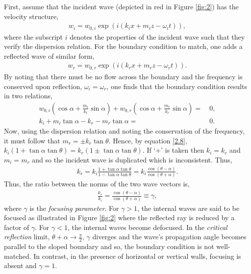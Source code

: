 \documentclass[a4paper]{article}
\numberwithin{equation}{section}
\begin{document}
First, assume that the incident wave (depicted in red in Figure \ref{fig:2}) has the velocity structure, 
\begin{align*}
w_i = w_{0,i}\exp(i(k_ix+m_iz-\omega_i t)),
\end{align*}
where the subscript $i$ denotes the properties of the incident wave such that they verify the dispersion relation. For the boundary condition to match, one adds a reflected wave of similar form, 
\begin{align*}
w_r = w_{0,r}\exp(i(k_rx+m_rz-\omega_r t)).
\end{align*}
By noting that there must be no flow across the boundary and the frequency is conserved upon reflection, $\omega_i = \omega_r$, one finds that the boundary condition results in two relations, 
\begin{align}\label{eq:2.7}
w_{0,i}(\cos \alpha + \frac{m_i}{k_i}\sin\alpha) + w_{0,r}(\cos \alpha + \frac{m_r}{k_r}\sin\alpha) =&~ 0, \\ \label{2.8}
k_i + m_i\tan \alpha - k_r - m_r\tan\alpha =&~ 0.
\end{align}
Now, using the dispersion relation and noting the conservation of the frequency, it must follow that $m_r = \pm k_r\tan\theta$. Hence, by equation \eqref{2.8}, $k_i(1 + \tan\alpha\tan\theta) = k_r(1 \pm \tan\alpha\tan\theta)$. If ‘$+$' is taken then $k_i = k_r$ and $m_i = m_r$ and so the incident wave is duplicated which is inconsistent. Thus,
\begin{align*}
k_r = k_i\frac{1 + \tan\alpha\tan\theta}{1 - \tan\alpha\tan\theta} = k_i \frac{\cos(\theta - \alpha)}{\cos(\theta + \alpha)}.
\end{align*}
Thus, the ratio between the norms of the two wave vectors is, 
\begin{align}\label{eq:2.9}
\frac{k_r}{k_i} = \frac{\cos(\theta - \alpha)}{\cos(\theta + \alpha)} \equiv \gamma,
\end{align}
where $\gamma$ is the \emph{focusing parameter}. For $\gamma > 1$, the internal waves are said to be focused as illustrated in Figure \ref{fig:2} where the reflected ray is reduced by a factor of $\gamma$. For $\gamma < 1$, the internal waves become defocused. In the \emph{critical reflection} limit, $\theta + \alpha \rightarrow \frac{\pi}{2}$, $\gamma$ diverges and the wave's propagation angle becomes parallel to the sloped boundary and so, the boundary condition is not well-matched. In contrast, in the presence of horizontal or vertical walls, focusing is absent and $\gamma = 1$. 
\end{document}
